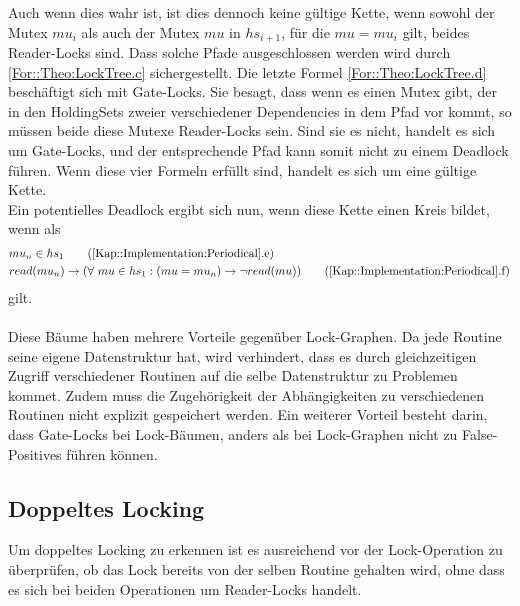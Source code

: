 Auch wenn dies wahr ist, ist dies dennoch keine gültige Kette, wenn sowohl der
Mutex $mu_i$ als auch der Mutex $mu$ in $hs_{i+1}$, für die $mu = mu_i$ gilt, 
beides Reader-Locks sind. Dass solche Pfade ausgeschlossen werden wird durch 
\eqref{For::Theo:LockTree.c} sichergestellt. Die letzte Formel 
\eqref{For::Theo:LockTree.d} beschäftigt sich mit Gate-Locks. 
Sie besagt, dass wenn es einen Mutex gibt, 
der in den HoldingSets zweier verschiedener Dependencies in dem Pfad vor kommt, 
so müssen beide diese Mutexe Reader-Locks sein. Sind sie es nicht, handelt es 
sich um Gate-Locks, und der entsprechende Pfad kann somit nicht zu einem 
Deadlock führen. Wenn diese vier Formeln erfüllt sind, handelt es sich um eine 
gültige Kette.\\
Ein potentielles Deadlock ergibt sich nun, wenn diese Kette einen Kreis 
bildet, wenn als 
\begin{align}
  &mu_n \in hs_{1} 
  \tag{\ref{Kap::Implementation:Periodical}.e}
  \label{For::Implementation:Periodical.e}\\
  &read(mu_n) \rightarrow 
  (\forall\ mu \in hs_{1}: (mu = mu_n) \to \lnot read(mu))
  \tag{\ref{Kap::Implementation:Periodical}.f}
  \label{For::Implementation:Periodical.f}
\end{align}
gilt.\\\\
Diese Bäume haben mehrere Vorteile gegenüber Lock-Graphen. Da jede Routine seine 
eigene Datenstruktur hat, wird verhindert, dass es durch 
gleichzeitigen Zugriff verschiedener Routinen auf die selbe Datenstruktur zu 
Problemen kommet. Zudem muss die Zugehörigkeit der Abhängigkeiten zu 
verschiedenen Routinen nicht explizit gespeichert werden. Ein weiterer Vorteil 
besteht darin, dass Gate-Locks bei Lock-Bäumen, anders als bei Lock-Graphen
nicht zu False-Positives führen können.


\subsection{Doppeltes Locking}
Um doppeltes Locking zu erkennen ist es ausreichend vor der Lock-Operation 
zu überprüfen, ob das Lock bereits von der selben Routine gehalten wird, ohne 
dass es sich bei beiden Operationen um Reader-Locks handelt.


